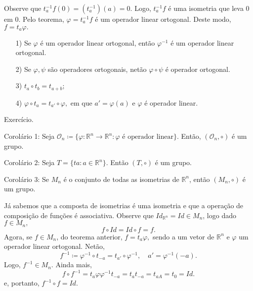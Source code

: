 \documentclass[Algebra/algebra_notes.tex]{subfiles}
\begin{document}
\begin{proof*}
	Observe que $t_{a}^{-1}f(0)=(t_{a}^{-1})(a)=0.$ Logo, $t_{a}^{-1}f$ é uma isometria que leva 0 em 0. Pelo teorema, $\varphi =t_{a}^{-1}f$
	é um operador linear ortogonal. Deste modo, $f=t_{a}\varphi .$ \qedsymbol
\end{proof*}
\begin{prop*}
	\begin{itemize}
		\item[1)] Se $\varphi $ é um operador linear ortogonal, então $\varphi ^{-1}$ é um operador linear ortogonal.
		\item[2)] Se $\varphi , \psi$ são operadores ortogonais, netão $\varphi\circ{\psi}$ é operador ortogonal.
		\item[3)] $t_{a}\circ{t_{b}}=t_{a+b};$
		\item[4)] $\varphi\circ{t_{a}}=t_{a'}\circ{\varphi },$ em que $a'=\varphi (a)$ e $\varphi $ é operador linear.
	\end{itemize}
\end{prop*}
\begin{proof*}
	Exercício.
\end{proof*}
\begin{crl*}
	Corolário 1: Seja $\mathcal{O}_{n}\coloneqq\{\varphi :\mathbb{R}^{n}\rightarrow \mathbb{R}^{n}: \varphi \text{ é operador linear}\}$.
	Então, $(\mathcal{O}_{n}, \circ)$ é um grupo.
\end{crl*}
\begin{crl*}
	Corolário 2: Seja $T=\{ta:a\in \mathbb{R}^{n}\}$. Então $(T, \circ)$ é um grupo.
\end{crl*}
\begin{crl*}
	Corolário 3: Se $M_{n}$ é o conjunto de todas as isometrias de $\mathbb{R}^{n}$, então $(M_{n}, \circ)$ é um grupo.
\end{crl*}
\begin{proof*}
	Já sabemos que a composta de isometrias é uma isometria e que a operação de composição de funções é associativa.
	Observe que $Id_{\mathbb{R}^{n}}=Id\in M_{n}$, logo dado $f\in M_{n},$
	$$
		f\circ{Id}=Id\circ{f}=f.
	$$
	Agora, se $f\in M_{n}$, do teorema anterior, $f = t_{a}\varphi ,$ sendo a um vetor de $\mathbb{R}^{n}$ e $\varphi $
	um operador linear ortogonal. Netão,
	$$
		f^{-1}\coloneqq\varphi ^{-1}\circ{t_{-a}}=t_{a'}\circ{\varphi ^{-1}},\quad a'=\varphi ^{-1}(-a).
	$$
	Logo, $f^{-1}\in M_{n}.$ Ainda mais,
	$$
		f\circ{f^{-1}} = t_{a}\varphi \varphi ^{-1}t_{-a}=t_{a}t_{-a}=t_{a A}=t_{0}=Id.
	$$
	e, portanto, $f^{-1}\circ{f}=Id.$ \qedsymbol
\end{proof*}
\end{document}
